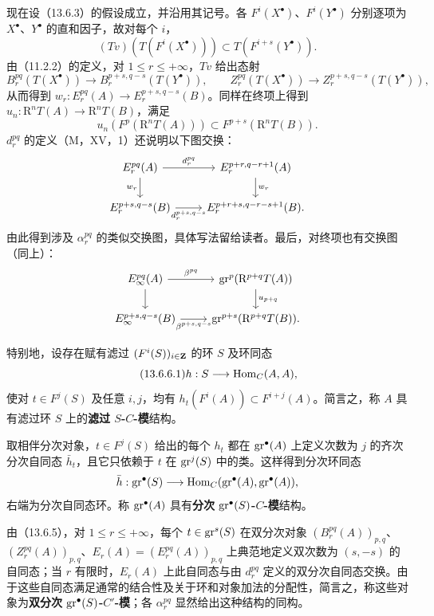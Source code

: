 现在设（13.6.3）的假设成立，并沿用其记号。各 $F^i(X^\bullet)$、$F^i(Y^\bullet)$ 分别逐项为 $X^\bullet$、$Y^\bullet$ 的直和因子，故对每个 $i$，
\[
(Tv)(T(F^i(X^\bullet)))\subset T(F^{i+s}(Y^\bullet)).
\]
由（11.2.2）的定义，对 $1\leq r\leq+\infty$，$Tv$ 给出态射
\[
B_r^{pq}(T(X^\bullet))\to B_r^{p+s,q-s}(T(Y^\bullet)),\qquad
Z_r^{pq}(T(X^\bullet))\to Z_r^{p+s,q-s}(T(Y^\bullet)),
\]
从而得到 $w_r:E_r^{pq}(A)\to E_r^{p+s,q-s}(B)$。同样在终项上得到 $u_n:\mathrm R^nT(A)\to\mathrm R^nT(B)$，满足
\[
u_n(F^p(\mathrm R^nT(A)))\subset F^{p+s}(\mathrm R^nT(B)).
\]
$d_r^{pq}$ 的定义（M，XV，1）还说明以下图交换：
\[
\begin{tikzcd}
E_r^{pq}(A)\arrow[r,"d_r^{pq}"]\arrow[d,"w_r"']&E_r^{p+r,q-r+1}(A)\arrow[d,"w_r"]\\
E_r^{p+s,q-s}(B)\arrow[r,"d_r^{p+s,q-s}"']&E_r^{p+r+s,q-r-s+1}(B).
\end{tikzcd}
\]
由此得到涉及 $\alpha_r^{pq}$ 的类似交换图，具体写法留给读者。最后，对终项也有交换图（同上）：
\[
\begin{tikzcd}
E_\infty^{pq}(A)\arrow[r,"\beta^{pq}"]\arrow[d]&\gr^p(\mathrm R^{p+q}T(A))\arrow[d,"u_{p+q}"]\\
E_\infty^{p+s,q-s}(B)\arrow[r,"\beta^{p+s,q-s}"']&\gr^{p+s}(\mathrm R^{p+q}T(B)).
\end{tikzcd}
\]

特别地，设存在赋有滤过 $(F^i(S))_{i\in\mathbf Z}$ 的环 $S$ 及环同态
\begin{equation}\tag{13.6.6.1}
h:S\longrightarrow\operatorname{Hom}_C(A,A),
\end{equation}
使对 $t\in F^j(S)$ 及任意 $i,j$，均有 $h_t(F^i(A))\subset F^{i+j}(A)$。简言之，称 $A$ 具有滤过环 $S$ 上的\textbf{滤过 $S$-$C$-模}结构。

取相伴分次对象，$t\in F^j(S)$ 给出的每个 $h_t$ 都在 $\operatorname{gr}^\bullet(A)$ 上定义次数为 $j$ 的齐次分次自同态 $\bar h_t$，且它只依赖于 $t$ 在 $\operatorname{gr}^j(S)$ 中的类。这样得到分次环同态
\[
\bar h:\operatorname{gr}^\bullet(S)\longrightarrow\operatorname{Hom}_C(\operatorname{gr}^\bullet(A),\operatorname{gr}^\bullet(A)),
\]
右端为分次自同态环。称 $\operatorname{gr}^\bullet(A)$ 具有\textbf{分次 $\operatorname{gr}^\bullet(S)$-$C$-模}结构。

由（13.6.5），对 $1\leq r\leq+\infty$，每个 $t\in\operatorname{gr}^s(S)$ 在双分次对象 $(B_r^{pq}(A))_{p,q}$、$(Z_r^{pq}(A))_{p,q}$、$E_r(A)=(E_r^{pq}(A))_{p,q}$ 上典范地定义双次数为 $(s,-s)$ 的自同态；当 $r$ 有限时，$E_r(A)$ 上此自同态与由 $d_r^{pq}$ 定义的双分次自同态交换。由于这些自同态满足通常的结合性及关于环和对象加法的分配性，简言之，称这些对象为\textbf{双分次 $\operatorname{gr}^\bullet(S)$-$C'$-模}；各 $\alpha_r^{pq}$ 显然给出这种结构的同构。

